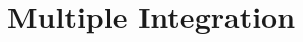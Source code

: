 \documentclass[../calc3.tex]{subfiles}
\begin{document}
\chapter{Multiple Integration}
\end{document}
